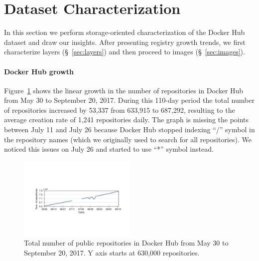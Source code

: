 \section{Dataset Characterization}
\label{sec:char}

In this section we perform storage-oriented characterization of the Docker Hub
dataset and draw our insights.
%
After presenting registry growth trends, we first characterize layers
(\S~\ref{sec:layers}) and then proceed to images (\S~\ref{sec:images}).
%
\paragraph{Docker Hub growth}
%
Figure~\ref{fig_image_growth} shows the linear
growth in the number of repositories in Docker Hub from May 30 to September 20,
2017.
%
%
During this 110-day period the total number of repositories increased by 53,337
from 633,915 to 687,292, resulting to the average creation rate of 1,241
repositories daily.
%
The graph is missing the points between July 11 and July 26 because Docker Hub
stopped indexing ``/'' symbol in the repository names (which we originally used
to search for all repositories).
%
We noticed this issues on July 26 and started to use ``*'' symbol instead.


\begin{figure}
  \centering
  \includegraphics[width=0.5\textwidth]{graphs/image_growth.pdf}
  \caption{Total number of public repositories in Docker Hub
	   from May 30 to September 20, 2017. Y axis starts
	   at 630,000 repositories.
	  }
  \label{fig_image_growth}
\end{figure}



